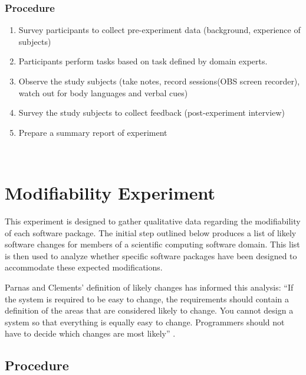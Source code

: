 \documentclass[letterpaper,cleveref]{lipics-v2019}
\theoremstyle{definition}
\begin{document}
\subsubsection {Procedure}
\begin {enumerate}

\item Survey participants to collect pre-experiment data (background, experience of subjects)
\item Participants perform tasks based on task defined by domain experts.
\item Observe the study subjects (take notes, record sessions(OBS screen recorder), watch out for body languages and verbal cues)
\item Survey the study subjects to collect feedback (post-experiment interview)
\item Prepare a summary report of experiment

\end {enumerate}






~\newpage
\section{Modifiability Experiment}

This experiment is designed to gather qualitative data regarding the modifiability of each software package. The initial step outlined below produces a list of likely software changes for members of a scientific computing software domain. This list is then used to analyze whether specific software packages have been designed to accommodate these expected modifications. 

Parnas and Clements' definition of likely changes has informed this analysis: ``If the system is required to be easy to change, the requirements should contain a definition of the areas that are considered likely to change. You cannot design a system so that everything is equally easy to change. Programmers should not have to decide which changes are most likely'' \cite{parnas1986rational}.



\subsection {Procedure}
\end{document}
